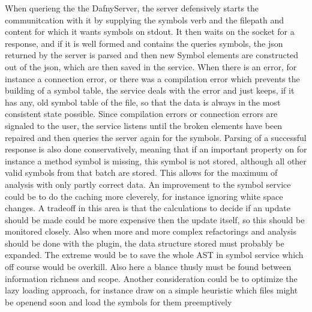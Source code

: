 When querieng the the DafnyServer, the server defensively starts the communitcation with it by supplying the symbols verb and the filepath and content for which it wants symbols on stdout. It then waits on the socket for a response, and if it is well formed and contains the queries symbols, the json returned by the server is parsed and then new Symbol elements are constructed out of the json, which are then saved in the service. \newline
When there is an error, for instance a connection error, or there was a compilation error which prevents the building of a symbol table, the service deals with the error and just keeps, if it has any, old symbol table of the file, so that the data is always in the most consistent state possible. Since compilation errors or connection errors are signaled to the user, the service listens until the broken elements have been repaired and then queries the server again for the symbols. \newline
Parsing of a successful response is also done conservatively, meaning that if an important property on for instance a method symbol is missing, this symbol is not stored, although all other valid symbols from that batch are stored. This allows for the maximum of analysis with only partly correct data. \newline
An improvement to the symbol service could be to do the caching more cleverely, for instance ignoring white space changes. A tradeoff in this area is that the calculations to decide if an update should be made could be more expensive then the update itself, so this should be monitored closely. Also when more and more complex refactorings and analysis should be done with the plugin, the data structure stored must probably be expanded. The extreme would be to save the whole AST in symbol service which off course would be overkill. Also here a blance thusly must be found between information richness and scope. Another consideration could be to optimize the lazy loading approach, for instance draw on a simple heuristic which files might be openend soon and load the symbols for them preemptively\newline
